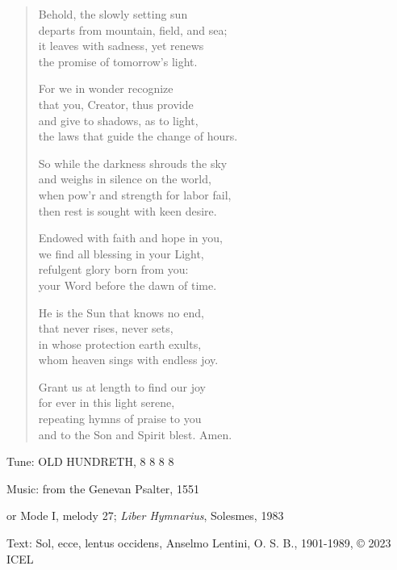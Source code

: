 \hymn

\begin{verse}
Behold, the slowly setting sun\\
departs from mountain, field, and sea;\\
it leaves with sadness, yet renews\\
the promise of tomorrow’s light.

For we in wonder recognize\\
that you, Creator, thus provide\\
and give to shadows, as to light,\\
the laws that guide the change of hours.

So while the darkness shrouds the sky\\
and weighs in silence on the world,\\
when pow’r and strength for labor fail,\\
then rest is sought with keen desire.

Endowed with faith and hope in you,\\
we find all blessing in your Light,\\
refulgent glory born from you:\\
your Word before the dawn of time.

He is the Sun that knows no end,\\
that never rises, never sets,\\
in whose protection earth exults,\\
whom heaven sings with endless joy.

Grant us at length to find our joy\\
for ever in this light serene,\\
repeating hymns of praise to you\\
and to the Son and Spirit blest. Amen.
\end{verse}

\begin{hymnsource}
Tune: OLD HUNDRETH, 8 8 8 8

Music: from the Genevan Psalter, 1551

or Mode I, melody 27; \emph{Liber Hymnarius}, Solesmes, 1983

Text: Sol, ecce, lentus occidens, Anselmo Lentini, O. S. B., 1901-1989, © 2023 ICEL
\end{hymnsource}